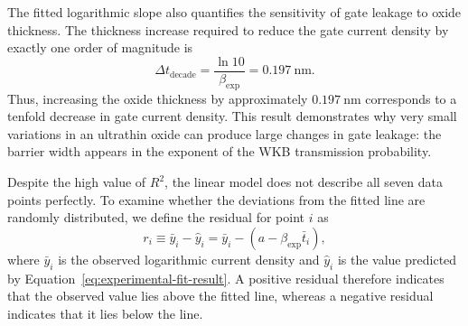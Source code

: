 \documentclass[12pt]{article}
\begin{document}
The fitted logarithmic slope also quantifies the sensitivity of gate leakage to oxide thickness. The thickness increase required to reduce the gate current density by exactly one order of magnitude is
\begin{equation}
    \Delta t_{\mathrm{decade}}
    =
    \frac{\ln 10}{\beta_{\mathrm{exp}}}
    =
    0.197~\mathrm{nm}.
\end{equation}
Thus, increasing the oxide thickness by approximately \(0.197~\mathrm{nm}\) corresponds to a tenfold decrease in gate current density. This result demonstrates why very small variations in an ultrathin oxide can produce large changes in gate leakage: the barrier width appears in the exponent of the WKB transmission probability.
 
Despite the high value of \(R^2\), the linear model does not describe all seven data points perfectly. To examine whether the deviations from the fitted line are randomly distributed, we define the residual for point \(i\) as
\begin{equation}
    r_i
    \equiv
    \bar{y}_i-\hat{y}_i
    =
    \bar{y}_i-
    \left(
        a-\beta_{\mathrm{exp}}\bar{t}_i
    \right),
    \label{eq:experimental-residual}
\end{equation}
where \(\bar{y}_i\) is the observed logarithmic current density and \(\hat{y}_i\) is the value predicted by Equation~\eqref{eq:experimental-fit-result}. A positive residual therefore indicates that the observed value lies above the fitted line, whereas a negative residual indicates that it lies below the line.
\end{document}
